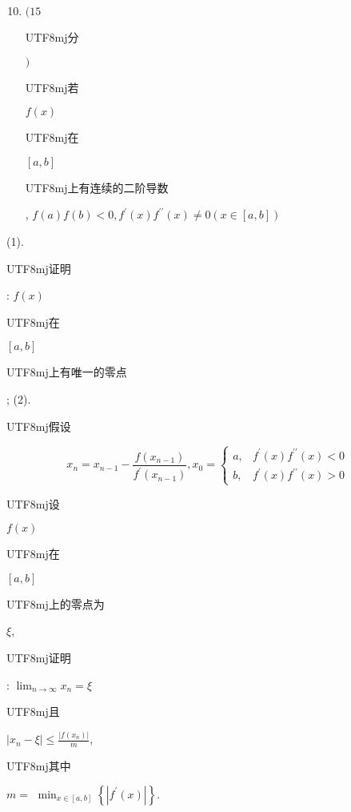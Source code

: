 \documentclass[10pt]{article}
\begin{document}
\begin{enumerate}
  \setcounter{enumi}{9}
  \item $(15$ \begin{CJK}{UTF8}{mj}分\end{CJK} $)$ \begin{CJK}{UTF8}{mj}若\end{CJK} $f(x)$ \begin{CJK}{UTF8}{mj}在\end{CJK} $[a, b]$ \begin{CJK}{UTF8}{mj}上有连续的二阶导数\end{CJK}, $f(a) f(b)<0, f^{\prime}(x) f^{\prime \prime}(x) \neq 0(x \in[a, b])$
\end{enumerate}
(1). \begin{CJK}{UTF8}{mj}证明\end{CJK}: $f(x)$ \begin{CJK}{UTF8}{mj}在\end{CJK} $[a, b]$ \begin{CJK}{UTF8}{mj}上有唯一的零点\end{CJK}; (2). \begin{CJK}{UTF8}{mj}假设\end{CJK}
$$
x_{n}=x_{n-1}-\frac{f\left(x_{n-1}\right)}{f^{\prime}\left(x_{n-1}\right)}, x_{0}= \begin{cases}a, & f^{\prime}(x) f^{\prime \prime}(x)<0 \\ b, & f^{\prime}(x) f^{\prime \prime}(x)>0\end{cases}
$$
\begin{CJK}{UTF8}{mj}设\end{CJK} $f(x)$ \begin{CJK}{UTF8}{mj}在\end{CJK} $[a, b]$ \begin{CJK}{UTF8}{mj}上的零点为\end{CJK} $\xi$, \begin{CJK}{UTF8}{mj}证明\end{CJK}: $\lim _{n \rightarrow \infty} x_{n}=\xi$ \begin{CJK}{UTF8}{mj}且\end{CJK} $\left|x_{n}-\xi\right| \leq \frac{\left|f\left(x_{n}\right)\right|}{m}$, \begin{CJK}{UTF8}{mj}其中\end{CJK} $m=$ $\min _{x \in[a, b]}\left\{\left|f^{\prime}(x)\right|\right\}$.
\end{document}
